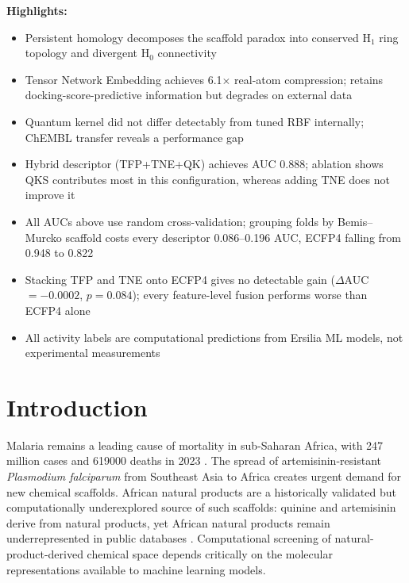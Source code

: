 \documentclass[pdflatex,sn-mathphys-num]{sn-jnl}%
\begin{document}
{\textbf{Highlights:}
\begin{itemize}
\item Persistent homology decomposes the scaffold paradox into conserved H$_1$ ring topology and divergent H$_0$ connectivity
\item Tensor Network Embedding achieves \num{6.1}$\times$ real-atom compression; retains docking-score-predictive information but degrades on external data
\item Quantum kernel did not differ detectably from tuned RBF internally; ChEMBL transfer reveals a performance gap
\item Hybrid descriptor (TFP+TNE+QK) achieves AUC \num{0.888}; ablation shows QKS contributes most in this configuration, whereas adding TNE does not improve it
\item All AUCs above use random cross-validation; grouping folds by Bemis--Murcko scaffold costs every descriptor \numrange{0.086}{0.196} AUC, ECFP4 falling from \num{0.948} to \num{0.822}
\item Stacking TFP and TNE onto ECFP4 gives no detectable gain ($\Delta$AUC $= \num{-0.0002}$, $p = \num{0.084}$); every feature-level fusion performs worse than ECFP4 alone
\item All activity labels are computational predictions from Ersilia ML models, not experimental measurements
\end{itemize}}


\maketitle


\section{Introduction}\label{sec:intro}

Malaria remains a leading cause of mortality in sub-Saharan Africa, with \num{247} million cases and \num{619000} deaths in 2023 \cite{who2024malariareport}. The spread of artemisinin-resistant \emph{Plasmodium falciparum} from Southeast Asia to Africa \cite{ariyey2014,ashley2018} creates urgent demand for new chemical scaffolds. African natural products are a historically validated but computationally underexplored source of such scaffolds: quinine and artemisinin derive from natural products, yet African natural products remain underrepresented in public databases \cite{anpdb_2026,value_addition_african_np_2025}. Computational screening of natural-product-derived chemical space depends critically on the molecular representations available to machine learning models.
\end{document}
